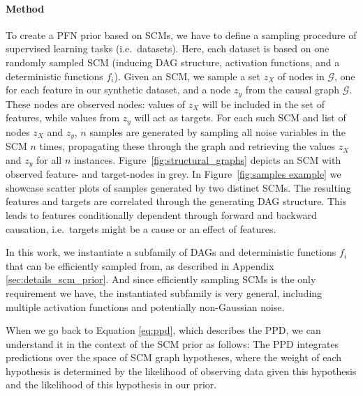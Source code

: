 \documentclass{article}
\begin{document}
\paragraph{Method}
To create a PFN prior based on SCMs, we have to define a sampling procedure of supervised learning tasks (i.e.\ datasets).
Here, each dataset is based on one randomly sampled SCM (inducing DAG structure, activation functions, and a deterministic functions $f_i$).
Given an SCM, we sample a set $z_X$ of nodes in $\mathcal{G}$, one for each feature in our synthetic dataset, and a node $z_y$ from the causal graph $\mathcal{G}$.
These nodes are observed nodes: values of $z_X$ will be included in the set of features, while values from $z_y$ will act as targets.
For each such SCM and list of nodes $z_X$ and $z_y$, $n$ samples are generated by sampling all noise variables in the SCM $n$ times, propagating these through the graph and retrieving the values $z_X$ and $z_y$ for all $n$ instances.
Figure~\ref{fig:structural_graphs} depicts an SCM with observed feature- and target-nodes in grey.
In Figure~\ref{fig:samples example} we showcase scatter plots of samples generated by two distinct SCMs. 
The resulting features and targets are correlated through the generating DAG structure.
This leads to features conditionally dependent through forward and backward causation, i.e.\ targets might be a cause or an effect of features.

In this work, we instantiate a subfamily of DAGs and deterministic functions $f_i$ that can be efficiently sampled from, as described in Appendix \ref{sec:details_scm_prior}.
And since efficiently sampling SCMs is the only requirement we have, the instantiated subfamily is very general, including multiple activation functions and potentially non-Gaussian noise.

When we go back to Equation \ref{eq:ppd}, which describes the PPD, we can understand it in the context of the SCM prior as follows:
The PPD integrates predictions over the space of SCM graph hypotheses, where the weight of each hypothesis is determined by the likelihood of observing data given this hypothesis and the likelihood of this hypothesis in our prior.
\end{document}
